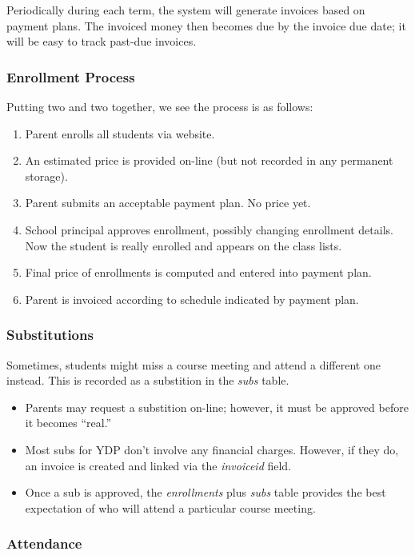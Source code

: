 \documentclass[11pt]{article}
\begin{document}
Periodically during each term, the system will generate invoices based
on payment plans.  The invoiced money then becomes due by the invoice
due date; it will be easy to track past-due invoices.

\subsubsection{Enrollment Process}

Putting two and two together, we see the process is as follows:
 \begin{enumerate}
 \item Parent enrolls all students via website.
 \item An estimated price is provided on-line (but not recorded in any permanent storage).
 \item Parent submits an acceptable payment plan.  No price yet.
 \item School principal approves enrollment, possibly changing enrollment details.  Now the student is really enrolled and appears on the class lists.
 \item Final price of enrollments is computed and entered into payment plan.
 \item Parent is invoiced according to schedule indicated by payment plan.
 \end{enumerate}

\subsubsection{Substitutions}

Sometimes, students might miss a course meeting and attend a different one instead.  This is recorded as a substition in the \emph{subs} table.
 \begin{itemize}
 \item Parents may request a substition on-line; however, it must be approved before it becomes ``real.''

 \item Most subs for YDP don't involve any financial charges.  However, if they do, an invoice is created and linked via the \emph{invoiceid} field.

 \item Once a sub is approved, the \emph{enrollments} plus \emph{subs} table provides the best expectation of who will attend a particular course meeting.
 \end{itemize}

\subsubsection{Attendance}
\end{document}

